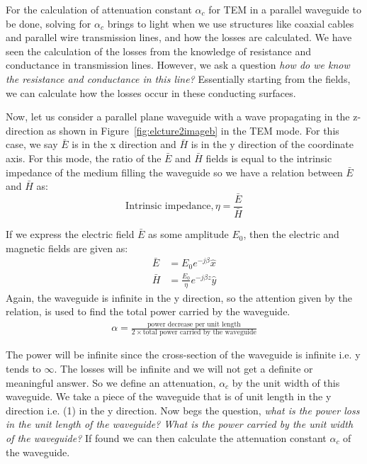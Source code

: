 For the calculation of attenuation constant $\alpha_c$  for TEM in a parallel waveguide to be done, solving for $\alpha_c$ brings to light when we use structures like coaxial cables and parallel wire transmission lines, and how the losses are calculated. We have seen the calculation of the losses from the knowledge of resistance and conductance in transmission lines. However, we ask a question \emph{how do we know the resistance and conductance in this line?} Essentially starting from the fields, we can calculate how the losses occur in these conducting surfaces.

Now, let us consider a parallel plane waveguide with a wave propagating in the z-direction as shown in Figure~\ref{fig:elcture2imageb} in the TEM mode. For this case, we say $\bar{E}$ is in the x direction and $\bar{H}$ is in the y direction of the coordinate axis. For this mode, the ratio of the $\bar{E}$ and $\bar{H}$ fields is equal to the intrinsic impedance of the medium filling the waveguide so we have a relation between $\bar{E}$ and $\bar{H}$ as:
\begin{dmath*}
\text{Intrinsic impedance}, \eta = \frac{\bar{E}}{\bar{H}}
\end{dmath*}

If we express the electric field $\bar{E}$ as some amplitude $E_0$, then the electric and magnetic fields are given as:
\begin{align*}
\bar{E} &= E_0 e^{-j\beta }\hat{x}\\
\bar{H} &= \frac{E_0}{\eta} e^{-j\beta z}\hat{y}
\end{align*}
Again, the waveguide is infinite in the y direction, so the attention given by the relation, is used to find the total power carried by the waveguide.
\begin{align}
\alpha = \frac{\text{power decrease per unit length}}{2 \times \text{total power carried by the waveguide}}
\label{eqn:alphac}
\end{align}

The power will be infinite since the cross-section of the waveguide is infinite i.e. y tends to $\infty$. The losses will be infinite and we will not get a definite or meaningful answer. So we define an attenuation, $\alpha_{c}$ by the unit width of this waveguide. We take a piece of the waveguide that is of unit length in the y direction i.e. (1) in the y direction. Now begs the question, \emph{what is the power loss in the unit length of the waveguide? What is the power carried by the unit width of the waveguide?} If found we can then calculate the attenuation constant $\alpha_{c}$ of the waveguide.

